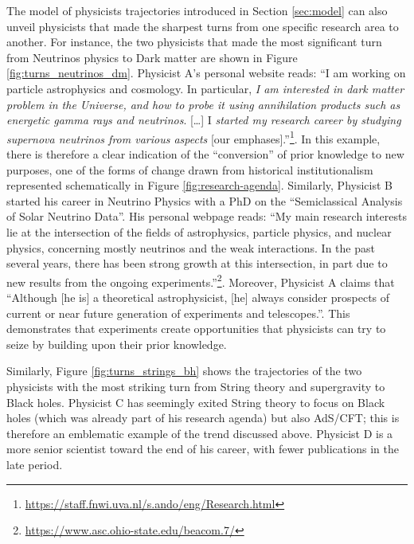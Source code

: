 \documentclass{article}
\begin{document}
The model of physicists trajectories introduced in Section \ref{sec:model} can also unveil physicists that made the sharpest turns from one specific research area to another. For instance, the two physicists that made the most significant turn from Neutrinos physics to Dark matter are shown in Figure \ref{fig:turns_neutrinos_dm}. Physicist A's personal website reads: ``I am working on particle astrophysics and cosmology. In particular, \textit{I am interested in dark matter problem in the Universe, and how to probe it using annihilation products such as energetic gamma rays and neutrinos}. [\dots]  I \textit{started my research career by studying supernova neutrinos from various aspects} [our emphases].''\footnote{\url{https://staff.fnwi.uva.nl/s.ando/eng/Research.html}}. In this example, there is therefore a clear indication of the ``conversion'' of prior knowledge to new purposes, one of the forms of change drawn from historical institutionalism represented schematically in Figure \ref{fig:research-agenda}. Similarly, Physicist B started his career in Neutrino Physics with a PhD on the ``Semiclassical Analysis of Solar Neutrino Data''.  His personal webpage reads: ``My main research interests lie at the intersection of the fields of astrophysics, particle physics, and nuclear physics, concerning mostly neutrinos and the weak interactions. In the past several years, there has been strong growth at this intersection, in part due to new results from the ongoing experiments.''\footnote{\url{https://www.asc.ohio-state.edu/beacom.7/}}. Moreover, Physicist A claims that ``Although [he is] a theoretical astrophysicist, [he] always consider prospects of current or near future generation of experiments and telescopes.''. This demonstrates that experiments create opportunities that physicists can try to seize by building upon their prior knowledge. 

Similarly, Figure \ref{fig:turns_strings_bh} shows the trajectories of the two physicists with the most striking turn from String theory and supergravity to Black holes. Physicist C has seemingly exited String theory to focus on Black holes (which was already part of his research agenda) but also AdS/CFT; this is therefore an emblematic example of the trend discussed above. Physicist D is a more senior scientist toward the end of his career, with fewer publications in the late period.
\end{document}
